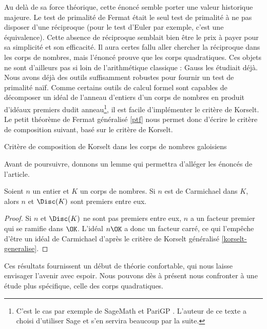 Au delà de sa force théorique, cette énoncé semble porter une valeur historique majeure. Le test de primalité de Fermat était le seul test de primalité à ne pas disposer d'une réciproque (pour le test d'Euler par exemple, c'est une équivalence). Cette absence de réciproque semblait bien être le prix à payer pour sa simplicité et son efficacité. Il aura certes fallu aller chercher la réciproque dans les corps de nombres, mais l'énoncé prouve que les corps quadratiques. Ces objets ne sont d'ailleurs pas si loin de l'arithmétique classique : Gauss les étudiait déjà. \\

Nous avons déjà des outils suffisamment robustes pour fournir un test de primalité naïf. Comme certains outils de calcul formel sont capables de décomposer un idéal de l'anneau d'entiers d'un corps de nombres en produit d'idéaux premiers dudit anneau\footnote{C'est le cas par exemple de SageMath et PariGP . L'auteur de ce texte a choisi d'utiliser Sage et s'en servira beaucoup par la suite.}, il est facile d'implémenter le critère de Korselt. Le petit théorème de Fermat généralisé \ref{ptf} nous permet donc d'écrire le critère de composition suivant, basé sur le critère de Korselt.

\vspace{1em}
\begin{algorithm}[H]\label{test-primalite-korselt}
\caption{Critère de composition de Korselt dans les corps de nombres galoisiens}
\end{algorithm}
\vspace{1em}

Avant de poursuivre, donnons un lemme qui permettra d'alléger les énoncés de l'article.

\begin{lemme}
	Soient $n$ un entier et $K$ un corps de nombres. Si $n$ est de Carmichael dans $K$, alors $n$ et $\Disc(K)$ sont premiers entre eux.
\end{lemme}

\begin{proof}
	Si $n$ et $\Disc(K)$ ne sont pas premiers entre eux, $n$ a un facteur premier qui se ramifie dans $\OK$. L'idéal $n\OK$ a donc un facteur carré, ce qui l'empêche d'être un idéal de Carmichael d'après le critère de Korselt généralisé \ref{korselt-generalise}.
\end{proof}

Ces résultats fournissent un début de théorie confortable, qui nous laisse envisager l'avenir avec espoir. Nous pouvons dès à présent nous confronter à une étude plus spécifique, celle des corps quadratiques.
